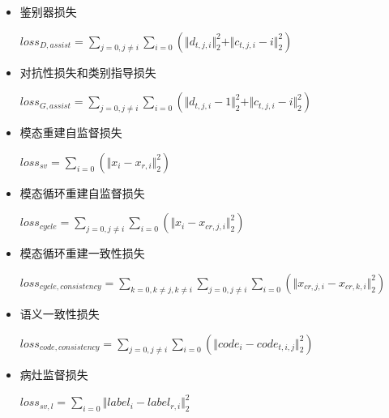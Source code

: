 \documentclass[letterpaper]{article} %
\begin{document}
\begin{itemize}
	\item 鉴别器损失
	
	\begin{center}
		$loss_{D,assist}=\sum\limits_{j=0,j\neq i}\sum\limits_{i=0}(\Vert{d_{t,j,i}}\Vert_{2}^{2}+\Vert{c_{t,j,i}-i}\Vert_{2}^{2})$
	\end{center}
	
	\item 对抗性损失和类别指导损失
	
	\begin{center}
		$loss_{G,assist}=\sum\limits_{j=0,j\neq i}\sum\limits_{i=0}(\Vert{d_{t,j,i}-1}\Vert_{2}^{2}+\Vert{c_{t,j,i}-i}\Vert_{2}^{2})$
	\end{center}
	
	\item 模态重建自监督损失
	
	\begin{center}
		$loss_{sv}=\sum\limits_{i=0}(\Vert{x_i-x_{r,i}}\Vert_{2}^{2})$
	\end{center}
	
	\item 模态循环重建自监督损失
	
	\begin{center}
		$loss_{cycle}=\sum\limits_{j=0,j\neq i}\sum\limits_{i=0}(\Vert{x_i-x_{cr,j,i}}\Vert_{2}^{2})$
	\end{center}
	
	\item 模态循环重建一致性损失
	
	\begin{center}
		$loss_{cycle,consistency}=\sum\limits_{k=0,k\neq j,k\neq i}\sum\limits_{j=0,j\neq i}\sum\limits_{i=0}(\Vert{x_{cr,j,i}-x_{cr,k,i}}\Vert_{2}^{2})$
	\end{center}
	
	\item 语义一致性损失
	
	\begin{center}
		$loss_{code,consistency}=\sum\limits_{j=0,j\neq i}\sum\limits_{i=0}(\Vert{code_i-code_{t,i,j}}\Vert_{2}^{2})$
	\end{center}
	
	\item 病灶监督损失
	
	\begin{center}
		$loss_{sv,l}=\sum\limits_{i=0}\Vert{label_i-label_{r,i}}\Vert_{2}^{2}$
	\end{center}
	
\end{itemize}
\end{document}
